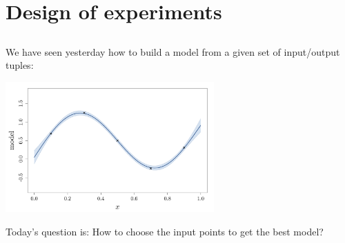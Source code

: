 \section[DoE]{Design of experiments}
\subsection{}


\begin{frame}{}
We have seen yesterday how to build a model from a given set of input/output tuples:
\begin{center}
\includegraphics[height=5cm]{2_Design_of_experiments/figures/R/model_0}
\end{center}
Today's question is: How to choose the input points to get the best model?
\end{frame}

